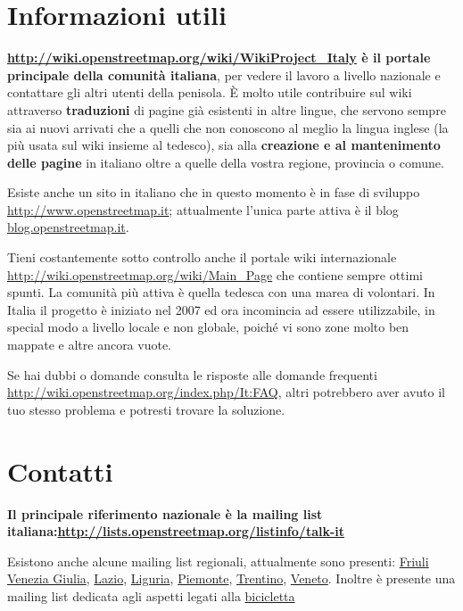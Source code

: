 \documentclass[a4paper,twoside,12pt,]{article}
\begin{document}
\section{Informazioni utili}
\textbf{\url{http://wiki.openstreetmap.org/wiki/WikiProject_Italy} è il portale principale della comunità italiana}, per vedere il lavoro a livello nazionale e contattare gli altri utenti della penisola. È molto utile contribuire sul wiki attraverso \textbf{traduzioni} di pagine già esistenti in altre lingue, che servono sempre sia ai nuovi arrivati che a quelli che non conoscono al meglio la lingua inglese (la più usata sul wiki insieme al tedesco), sia alla \textbf{creazione e al mantenimento delle pagine} in italiano oltre a quelle della vostra regione, provincia o comune.

Esiste anche un sito in italiano che in questo momento è in fase di sviluppo \url{http://www.openstreetmap.it}; attualmente l'unica parte attiva è il blog \url{blog.openstreetmap.it}.

Tieni costantemente sotto controllo anche il portale wiki internazionale \url{http://wiki.openstreetmap.org/wiki/Main_Page} che contiene sempre ottimi spunti.  La comunità più attiva è quella tedesca con una marea di volontari. In Italia il progetto è iniziato nel 2007 ed ora incomincia ad essere utilizzabile, in special modo a livello locale e non globale, poiché vi sono zone molto ben mappate e altre ancora vuote.

Se hai dubbi o domande consulta le risposte alle domande frequenti \url{http://wiki.openstreetmap.org/index.php/It:FAQ}, altri potrebbero aver avuto il tuo stesso problema e potresti trovare la soluzione.
\section{Contatti}
\textbf{Il principale riferimento nazionale è la mailing list italiana:\newline \url{http://lists.openstreetmap.org/listinfo/talk-it}}

Esistono anche alcune mailing list regionali, attualmente sono presenti: \href{http://lists.openstreetmap.org/listinfo/talk-it-fvg}{Friuli Venezia Giulia}, \href{http://lists.openstreetmap.org/listinfo/talk-it-lazio}{Lazio}, \href{http://lists.openstreetmap.org/listinfo/talk-it-liguria}{Liguria}, \href{http://lists.openstreetmap.org/listinfo/talk-it-piemonte}{Piemonte}, \href{http://lists.openstreetmap.org/listinfo/talk-it-trentino}{Trentino}, \href{http://liste.remixtj.net/listinfo/osmveneto}{Veneto}. Inoltre è presente una mailing list dedicata agli aspetti legati alla \href{http://lists.openstreetmap.org/listinfo/talk-it-bici}{bicicletta}
\end{document}
